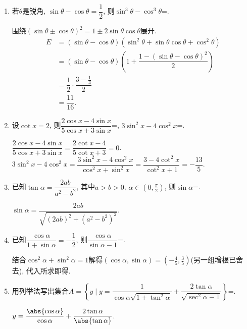 \begin{enumerate}
\item 若$\theta$是锐角, $\sin\theta-\cos\theta=\dfrac{1}{2}$, 则$\sin^3\theta-\cos^3\theta$=. 
\begin{jieda}
围绕$(\sin\theta\pm\cos\theta)^2=1\pm2\sin\theta\cos\theta$展开. 
\begin{align*}
E & =(\sin\theta-\cos\theta)(\sin^2\theta+\sin\theta\cos\theta+\cos^2\theta)\\
& = (\sin\theta-\cos\theta)\left(1+\dfrac{1-(\sin\theta-\cos\theta)^2}{2}\right)\\
& = \dfrac{1}{2}\cdot\dfrac{3-\frac{1}{4}}{2}\\
& = \dfrac{11}{16}.
\end{align*}
\end{jieda}

\item 设$\cot{x}=2$, 则$\dfrac{2\cos{x}-4\sin{x}}{5\cos{x}+3\sin{x}}$=, 
$3\sin^2x-4\cos^2x$=. 
\begin{jieda}
$\dfrac{2\cos{x}-4\sin{x}}{5\cos{x}+3\sin{x}}=\dfrac{2\cot{x}-4}{5\cot{x}+3}=0$. \\
$3\sin^2x-4\cos^2x=\dfrac{3\sin^2x-4\cos^2x}{\cos^2x+\sin^2x}=\dfrac{3-4\cot^2x}{\cot^2x+1}=-\dfrac{13}{5}$. 
\end{jieda}

\item 已知$\tan\alpha=\dfrac{2ab}{a^2-b^2}$, 其中$a>b>0$, $\alpha\in(0,\frac{\pi}{2})$, 则$\sin\alpha$=.
\begin{jieda}
$\sin\alpha=\dfrac{2ab}{\sqrt{(2ab)^2+(a^2-b^2)^2}}$. 
\end{jieda}

\item 已知$\dfrac{\cos\alpha}{1+\sin\alpha}=-\dfrac{1}{2}$, 则$\dfrac{\cos\alpha}{\sin\alpha-1}$=. 
\begin{jieda}
结合$\cos^2\alpha+\sin^2\alpha=1$解得$(\cos\alpha,\sin\alpha)=(-\frac{4}{5},\frac{3}{5})$(另一组增根已舍去), 
代入所求即得. 
\end{jieda}

\item 用列举法写出集合$A=\left\{y\mid y=\dfrac{1}{\cos\alpha\sqrt{1+\tan^2\alpha}}
+\dfrac{2\tan\alpha}{\sqrt{\sec^2\alpha-1}}\right\}$=.
\begin{jieda}
$y=\dfrac{\abs{\cos\alpha}}{\cos\alpha}+\dfrac{2\tan\alpha}{\abs{\tan\alpha}}$. 
\end{jieda}


\end{enumerate}
